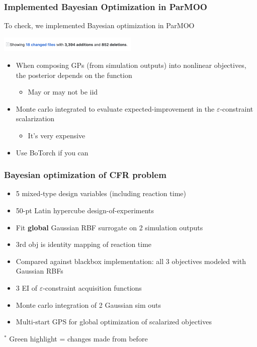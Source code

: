 \documentclass[aspectratio=169]{beamer}
\begin{document}
\begin{frame}\frametitle{Implemented Bayesian Optimization in ParMOO}

To check, we implemented Bayesian optimization in ParMOO

\bigskip
\begin{center}
\pause\includegraphics[width=0.5\textwidth]{../img/moo_new/bo-pr.png}
\end{center}

\begin{itemize}
\item When composing GPs (from simulation outputs) into nonlinear objectives, the posterior depends on the function
\begin{itemize}
\item May or may not be iid
\end{itemize}
\item Monte carlo integrated to evaluate expected-improvement in the $\varepsilon$-constraint scalarization
\begin{itemize}
\item It's very expensive
\end{itemize}
\pause\item Use BoTorch if you can
\end{itemize}
\end{frame}

\begin{frame}\frametitle{Bayesian optimization of CFR problem}
\begin{itemize}
\item 5 mixed-type design variables (including reaction time)
\item 50-pt Latin hypercube design-of-experiments
\item Fit {\bf global} Gaussian RBF surrogate on 2 simulation outputs
\item {\color{blue}3rd obj is identity mapping of reaction time}
\item {\color{red}Compared against blackbox implementation: all 3 objectives
modeled with Gaussian RBFs}
\item {\color{green}3 EI of $\varepsilon$-constraint acquisition functions}
\item {\color{green}Monte carlo integration of 2 Gaussian sim outs}
\item {\color{green}Multi-start GPS for global optimization of scalarized objectives}
\end{itemize}

\bigskip

$^*${\color{green} Green highlight} = changes made from before
\end{frame}
\end{document}
